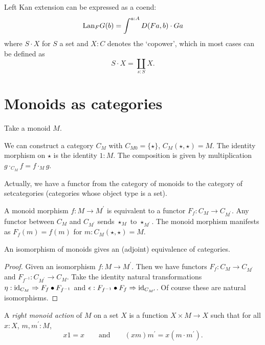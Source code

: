 \begin{remark}
  Left Kan extension can be expressed as a coend:
  \[ \text{Lan}_{F}G(b) = \int^{a : A} D(F a, b) \cdot G a \]
  where $ S \cdot X $ for $ S $ a set and $ X : C $ denotes the `copower', which in most cases can be defined as
  \[ S \cdot X = \coprod_{s : S} X. \]
\end{remark}


\section{Monoids as categories}\label{sec:monoid-category}
Take a monoid $ M $.
\begin{definition}
  We can construct a category $ C_M $ with $ C_{M0} = \{ \star \} $, $ C_M(\star, \star) = M $. The identity morphism on $ \star $ is the identity $ 1: M $. The composition is given by multiplication $ g \cdot_{C_M} f = f \cdot_M g $.
\end{definition}

\begin{remark}
  Actually, we have a functor from the category of monoids to the category of setcategories (categories whose object type is a set).

  A monoid morphism $ f: M \to M^\prime $ is equivalent to a functor $ F_f: C_M \to C_{M^\prime} $. Any functor between $ C_M $ and $ C_{M^\prime} $ sends $ \star_M $ to $ \star_{M^\prime} $. The monoid morphism manifests as $ F_f(m) = f(m) $ for $ m: C_M(\star, \star) = M $.
\end{remark}

\begin{lemma}
  An isomorphism of monoids gives an (adjoint) equivalence of categories.
\end{lemma}
\begin{proof}
  Given an isomorphism $ f: M \to M^\prime $. Then we have functors $ F_f: C_M \to C_{M^\prime} $ and $ F_{f^{-1}}: C_{M^\prime} \to C_M $. Take the identity natural transformations $ \eta: \text{id}_{C_M} \Rightarrow F_f \bullet F_{f^{-1}} $ and $ \epsilon: F_{f^{-1}} \bullet F_f \Rightarrow \text{id}_{C_{M^\prime}} $. Of course these are natural isomorphisms.
\end{proof}

\begin{definition}
  A \textit{right monoid action} of $ M $ on a set $ X $ is a function $ X \times M \to X $ such that for all $ x: X $, $ m, m^\prime: M $,
  \[ x 1 = x \qquad \text{and} \qquad (x m) m^\prime = x (m \cdot m^\prime). \]
\end{definition}

